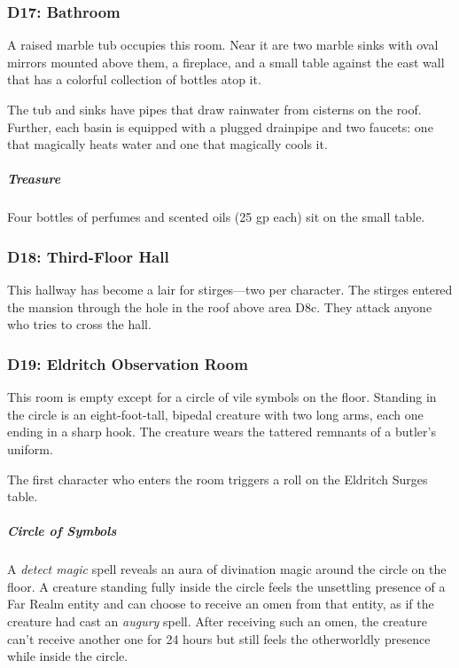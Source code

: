 \documentclass[10pt,a4paper,twoside,bg=print,twocolumn,openany,nodeprecatedcode]{dndbook}
\begin{document}
\subsubsection{D17: Bathroom}
\begin{DndReadAloud}{}
A raised marble tub occupies this room. Near it are two marble sinks with oval mirrors mounted above them, a fireplace, and a small table against the east wall that has a colorful collection of bottles atop it.

\end{DndReadAloud}

The tub and sinks have pipes that draw rainwater from cisterns on the roof. Further, each basin is equipped with a plugged drainpipe and two faucets: one that magically heats water and one that magically cools it.

\subparagraph{Treasure}
Four bottles of perfumes and scented oils (25 gp each) sit on the small table.

\subsubsection{D18: Third-Floor Hall}
This hallway has become a lair for stirges—two per character. The stirges entered the mansion through the hole in the roof above area D8c. They attack anyone who tries to cross the hall.

\subsubsection{D19: Eldritch Observation Room}
\begin{DndReadAloud}{}
This room is empty except for a circle of vile symbols on the floor. Standing in the circle is an eight-foot-tall, bipedal creature with two long arms, each one ending in a sharp hook. The creature wears the tattered remnants of a butler's uniform.

\end{DndReadAloud}

The first character who enters the room triggers a roll on the Eldritch Surges table.

\subparagraph{Circle of Symbols}
A \textit{detect magic} spell reveals an aura of divination magic around the circle on the floor. A creature standing fully inside the circle feels the unsettling presence of a Far Realm entity and can choose to receive an omen from that entity, as if the creature had cast an \textit{augury} spell. After receiving such an omen, the creature can't receive another one for 24 hours but still feels the otherworldly presence while inside the circle.
\end{document}
